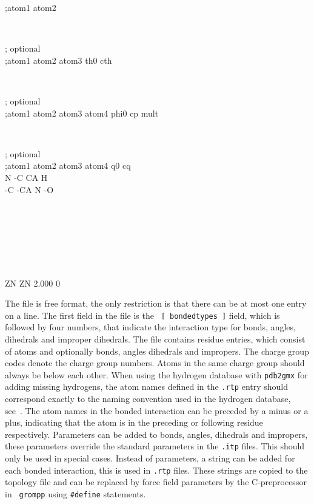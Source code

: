 \begin{small}
\begin{tt}
;atom1 atom2\\
\end{tt}\\
\begin{tt}
 [ angles ]  ; optional\\
;atom1 atom2 atom3    th0    cth\\
\end{tt}\\
\begin{tt}
 [ dihedrals ]  ; optional\\
;atom1 atom2 atom3 atom4   phi0     cp   mult\\
\end{tt}\\
\begin{tt}
 [ impropers ]  ; optional\\
;atom1 atom2 atom3 atom4     q0     cq\\
     N    -C    CA     H\\
    -C   -CA     N    -O\\
\end{tt}\\
\begin{tt}
[ ZN ]\\
\end{tt}\\
\begin{tt}
 [ atoms ]\\
    ZN    ZN   2.000     0\\
\end{tt}
\end{small}

The file is free format, the only restriction is that there can be at
most one entry on a line.  The first field in the file is the {\tt
[~bondedtypes~]} field, which is followed by four numbers, that
indicate the interaction type for bonds, angles, dihedrals and
improper dihedrals.  The file contains residue entries, which consist
of atoms and optionally bonds, angles dihedrals and impropers.  The
charge group codes denote the charge group numbers. Atoms in the same
charge group should always be below each other. When using the
hydrogen database with {\tt pdb2gmx} for adding missing hydrogens, the
atom names defined in the {\tt .rtp} entry should correspond exactly
to the naming convention used in the hydrogen database,
see~. The atom names in the bonded interaction can be
preceded by a minus or a plus, indicating that the atom is in the
preceding or following residue respectively.  Parameters can be added
to bonds, angles, dihedrals and impropers, these parameters override
the standard parameters in the {\tt .itp} files.  This should only be
used in special cases. Instead of parameters, a string can be added
for each bonded interaction, this is used in  {\tt .rtp}
files. These strings are copied to the topology file and can be
replaced by force field parameters by the C-preprocessor in {\tt
grompp} using {\tt \#define} statements.

